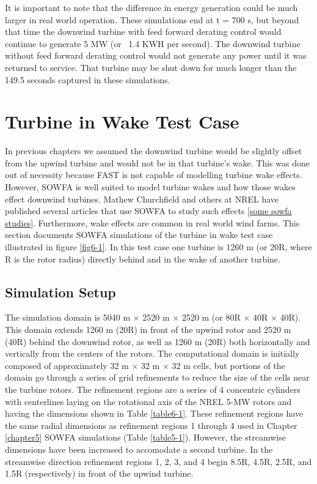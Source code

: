  It is important to note that the difference in energy generation could be much larger in real world operation. These simulations end at t = 700 s, but beyond that time the downwind turbine with feed forward derating control would continue to generate 5 MW (or ~1.4 KWH per second). The downwind turbine without feed forward derating control would not generate any power until it was returned to service. That turbine may be shut down for much longer than the 149.5 seconds captured in these simulations.

\section{Turbine in Wake Test Case} \label{section6-7}

In previous chapters we assumed the downwind turbine would be slightly offset from the upwind turbine and would not be in that turbine's wake. This was done out of necessity because FAST is not capable of modelling turbine wake effects. However, SOWFA is well suited to model turbine wakes and how those wakes effect downwind turbines. Mathew Churchfield and others at NREL have published several articles that use SOWFA to study such effects \ref{some sowfa studies}. Furthermore, wake effects are common in real world wind farms. This section documents SOWFA simulations of the turbine in wake test case illustrated in figure \ref{fig6-1}. In this test case one turbine is 1260 m (or 20R, where R is the rotor radius) directly behind and in the wake of another turbine.

\subsection{Simulation Setup} \label{section6-7-1}

The simulation domain is 5040 m $\times$ 2520 m $\times$ 2520 m (or 80R $\times$ 40R $\times$ 40R). This domain extends 1260 m (20R) in front of the upwind rotor and 2520 m (40R) behind the downwind rotor, as well as 1260 m (20R) both horizontally and vertically from the centers of the rotors. The computational domain is initially composed of approximately 32 m $\times$ 32 m $\times$ 32 m cells, but portions of the domain go through a series of grid refinements to reduce the size of the cells near the turbine rotors. The refinement regions are a series of 4 concentric cylinders with centerlines laying on the rotational axis of the NREL 5-MW rotors and having the dimensions shown in Table \ref{table6-1}. These refinement regions have the same radial dimensions as refinement regions 1 through 4 used in Chapter \ref{chapter5} SOWFA simulations (Table \ref{table5-1}). However, the streamwise dimensions have been increased to accomodate a second turbine. In the streamwise direction refinement regions 1, 2, 3, and 4 begin 8.5R, 4.5R, 2.5R, and 1.5R (respectively) in front of the upwind turbine.

